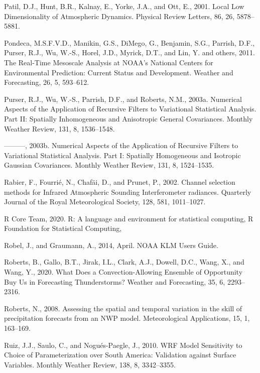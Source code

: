 \documentclass[12pt,oneside,a4paper]{reedthesis}
\begin{document}
\leavevmode\hypertarget{ref-patil2001}{}%
Patil, D.J., Hunt, B.R., Kalnay, E., Yorke, J.A., and Ott, E., 2001. Local Low Dimensionality of Atmospheric Dynamics. Physical Review Letters, 86, 26, 5878--5881.

\leavevmode\hypertarget{ref-pondeca2011}{}%
Pondeca, M.S.F.V.D., Manikin, G.S., DiMego, G., Benjamin, S.G., Parrish, D.F., Purser, R.J., Wu, W.-S., Horel, J.D., Myrick, D.T., and Lin, Y. and others, 2011. The Real-Time Mesoscale Analysis at NOAA's National Centers for Environmental Prediction: Current Status and Development. Weather and Forecasting, 26, 5, 593--612.

\leavevmode\hypertarget{ref-purser2003a}{}%
Purser, R.J., Wu, W.-S., Parrish, D.F., and Roberts, N.M., 2003a. Numerical Aspects of the Application of Recursive Filters to Variational Statistical Analysis. Part II: Spatially Inhomogeneous and Anisotropic General Covariances. Monthly Weather Review, 131, 8, 1536--1548.

\leavevmode\hypertarget{ref-purser2003}{}%
---------, 2003b. Numerical Aspects of the Application of Recursive Filters to Variational Statistical Analysis. Part I: Spatially Homogeneous and Isotropic Gaussian Covariances. Monthly Weather Review, 131, 8, 1524--1535.

\leavevmode\hypertarget{ref-rabier2002}{}%
Rabier, F., Fourrié, N., Chafäi, D., and Prunet, P., 2002. Channel selection methods for Infrared Atmospheric Sounding Interferometer radiances. Quarterly Journal of the Royal Meteorological Society, 128, 581, 1011--1027.

\leavevmode\hypertarget{ref-rcoreteam2020}{}%
R Core Team, 2020. R: A language and environment for statistical computing, R Foundation for Statistical Computing,

\leavevmode\hypertarget{ref-robel2014}{}%
Robel, J., and Graumann, A., 2014, April. NOAA KLM Users Guide.

\leavevmode\hypertarget{ref-roberts2020}{}%
Roberts, B., Gallo, B.T., Jirak, I.L., Clark, A.J., Dowell, D.C., Wang, X., and Wang, Y., 2020. What Does a Convection-Allowing Ensemble of Opportunity Buy Us in Forecasting Thunderstorms? Weather and Forecasting, 35, 6, 2293--2316.

\leavevmode\hypertarget{ref-roberts2008}{}%
Roberts, N., 2008. Assessing the spatial and temporal variation in the skill of precipitation forecasts from an NWP model. Meteorological Applications, 15, 1, 163--169.

\leavevmode\hypertarget{ref-ruiz2010}{}%
Ruiz, J.J., Saulo, C., and Nogués-Paegle, J., 2010. WRF Model Sensitivity to Choice of Parameterization over South America: Validation against Surface Variables. Monthly Weather Review, 138, 8, 3342--3355.
\end{document}
